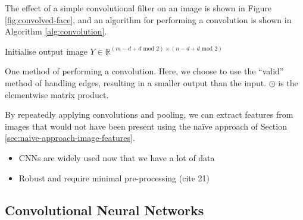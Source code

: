         The effect of a simple convolutional filter on an image is shown in
        Figure \ref{fig:convolved-face}, and an algorithm for performing a
        convolution is shown in Algorithm \ref{alg:convolution}.

        \begin{algorithm}

            Initialise output image $Y \in \mathbb{R}^{(m - d + d \text{ mod } 2) \times (n - d + d \text{ mod } 2)}$\;

            \caption{One method of performing a convolution. Here, we choose to
                use the ``valid'' method of handling edges, resulting in a
                smaller output than the input. $\odot$ is the elementwise
                matrix product.}
            \label{alg:convolution}
        \end{algorithm}

        By repeatedly applying convolutions and pooling, we can extract features
        from images that would not have been present using the na\"ive approach
        of Section \ref{sec:naive-approach-image-features}.

        \begin{itemize}
            \item CNNs are widely used now that we have a lot of data
            \item Robust and require minimal pre-processing (cite 21)
        \end{itemize}

    \subsection{Convolutional Neural Networks}
    \label{sec:convolutional-neural-networks}

